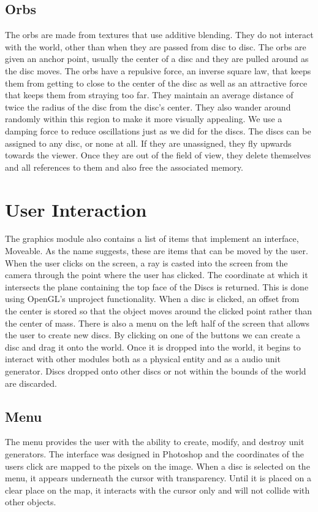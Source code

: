 \documentclass[pdftext,twoside,10pt]{article}
\begin{document}
\subsection{Orbs}
The orbs are made from textures that use additive blending. They do not interact with the world, other than when they are passed from disc to disc. The orbs are given an anchor point, usually the center of a disc and they are pulled around as the disc moves. The orbs have a repulsive force, an inverse square law, that keeps them from getting to close to the center of the disc as well as an attractive force that keeps them from straying too far. They maintain an average distance of twice the radius of the disc from the disc's center. They also wander around randomly within this region to make it more visually appealing. We use a damping force to reduce oscillations just as we did for the discs. The discs can be assigned to any disc, or none at all. If they are unassigned, they fly upwards towards the viewer. Once they are out of the field of view, they delete themselves and all references to them and also free the associated memory.

\section{User Interaction}
The graphics module also contains a list of items that implement an interface, Moveable. As the name suggests, these are items that can be moved by the user. When the user clicks on the screen, a ray is casted into the screen from the camera through the point where the user has clicked. The coordinate at which it intersects the plane containing the top face of the Discs is returned. This is done using OpenGL's unproject functionality. When a disc is clicked, an offset from the center is stored so that the object moves around the clicked point rather than the center of mass. There is also a menu on the left half of the screen that allows the user to create new discs. By clicking on one of the buttons we can create a disc and drag it onto the world. Once it is dropped into the world, it begins to interact with other modules both as a physical entity and as a audio unit generator. Discs dropped onto other discs or not within the bounds of the world are discarded.

\subsection{Menu}
The menu provides the user with the ability to create, modify, and destroy unit generators. The interface was designed in Photoshop and the coordinates of the users click are mapped to the pixels on the image. When a disc is selected on the menu, it appears underneath the cursor with transparency. Until it is placed on a clear place on the map, it interacts with the cursor only and will not collide with other objects.
\end{document}
